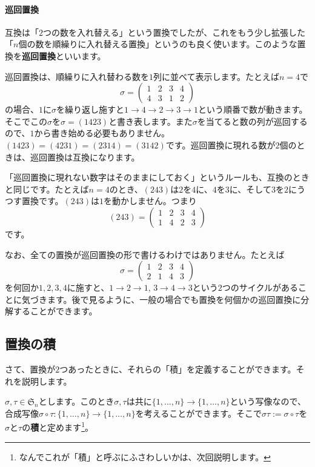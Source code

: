 \paragraph{巡回置換} 互換は「$2$つの数を入れ替える」という置換でしたが、これをもう少し拡張した「$n$個の数を順繰りに入れ替える置換」というのも良く使います。このような置換を\textbf{巡回置換}といいます。

巡回置換は、順繰りに入れ替わる数を$1$列に並べて表示します。たとえば$n = 4$で
\[
\sigma =
\begin{pmatrix}
1 & 2 & 3 & 4 \\
4 & 3 & 1 & 2
\end{pmatrix}
\]
の場合、$1$に$\sigma$を繰り返し施すと$1 \rightarrow 4 \rightarrow 2 \rightarrow 3 \rightarrow 1$という順番で数が動きます。そこでこの$\sigma$を$\sigma = (1423)$と書き表します。また$\sigma$を当てると数の列が巡回するので、$1$から書き始める必要もありません。$(1423) = (4231) = (2314) = (3142)$です。巡回置換に現れる数が$2$個のときは、巡回置換は互換になります。

「巡回置換に現れない数字はそのままにしておく」というルールも、互換のときと同じです。たとえば$n = 4$のとき、$(243)$は$2$を$4$に、$4$を$3$に、そして$3$を$2$にうつす置換です。$(243)$は$1$を動かしません。つまり
\[
(243) = 
\begin{pmatrix}
1 & 2 & 3 & 4 \\
1 & 4 & 2 & 3
\end{pmatrix}
\]
です。

なお、全ての置換が巡回置換の形で書けるわけではありません。たとえば
\[
\sigma = 
\begin{pmatrix}
1 & 2 & 3 & 4 \\
2 & 1 & 4 & 3
\end{pmatrix}
\]
を何回か$1, 2, 3, 4$に施すと、$1 \rightarrow 2 \rightarrow 1$, $3 \rightarrow 4 \rightarrow 3$という$2$つのサイクルがあることに気づきます。後で見るように、一般の場合でも置換を何個かの巡回置換に分解することができます。

\subsection{置換の積}

さて、置換が$2$つあったときに、それらの「積」を定義することができます。それを説明します。

$\sigma, \tau \in \mathfrak{S}_n$とします。このとき$\sigma, \tau$は共に$\{1, \ldots, n\}\rightarrow\{1, \ldots, n\}$という写像なので、合成写像$\sigma \circ \tau \colon \{1, \ldots, n\} \rightarrow \{1, \ldots, n\}$を考えることができます。そこで$\sigma\tau := \sigma \circ \tau$を$\sigma$と$\tau$の\textbf{積}と定めます\footnote{なんでこれが「積」と呼ぶにふさわしいかは、次回説明します。}。

